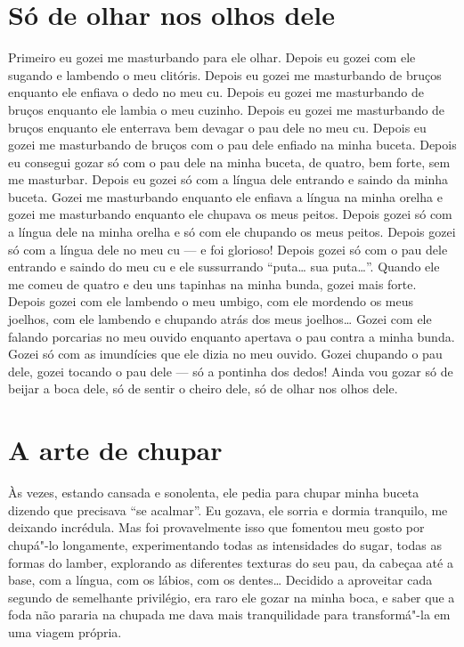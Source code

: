 \chapter{Só de olhar nos olhos dele}

Primeiro eu gozei me masturbando para ele olhar. Depois eu gozei com ele
sugando e lambendo o meu clitóris. Depois eu gozei me masturbando de
bruços enquanto ele enfiava o dedo no meu cu. Depois eu gozei me
masturbando de bruços enquanto ele lambia o meu cuzinho. Depois eu gozei
me masturbando de bruços enquanto ele enterrava bem devagar o pau dele
no meu cu. Depois eu gozei me masturbando de bruços com o pau dele
enfiado na minha buceta. Depois eu consegui gozar só com o pau dele na
minha buceta, de quatro, bem forte, sem me masturbar. Depois eu gozei só
com a língua dele entrando e saindo da minha buceta. Gozei me
masturbando enquanto ele enfiava a língua na minha orelha e gozei me
masturbando enquanto ele chupava os meus peitos. Depois gozei só com a
língua dele na minha orelha e só com ele chupando os meus peitos. Depois
gozei só com a língua dele no meu cu --- e foi glorioso! Depois gozei só
com o pau dele entrando e saindo do meu cu e ele sussurrando
``puta… sua puta…''. Quando ele me comeu de quatro e deu
uns tapinhas na minha bunda, gozei mais forte. Depois gozei com ele
lambendo o meu umbigo, com ele mordendo os meus joelhos, com ele
lambendo e chupando atrás dos meus joelhos… Gozei com ele falando
porcarias no meu ouvido enquanto apertava o pau contra a minha bunda.
Gozei só com as imundícies que ele dizia no meu ouvido. Gozei chupando o
pau dele, gozei tocando o pau dele --- só a pontinha dos dedos! Ainda
vou gozar só de beijar a boca dele, só de sentir o cheiro dele, só de
olhar nos olhos dele.

\chapter{A arte de chupar}

Às vezes, estando cansada e sonolenta, ele pedia para chupar minha
buceta dizendo que precisava ``se acalmar''. Eu gozava, ele sorria e
dormia tranquilo, me deixando incrédula. Mas foi provavelmente isso que
fomentou meu gosto por chupá"-lo longamente, experimentando todas as
intensidades do sugar, todas as formas do lamber, explorando as
diferentes texturas do seu pau, da cabeçaa até a base, com a língua, com
os lábios, com os dentes… Decidido a aproveitar cada segundo de
semelhante privilégio, era raro ele gozar na minha boca, e saber que a
foda não pararia na chupada me dava mais tranquilidade para
transformá"-la em uma viagem própria.

